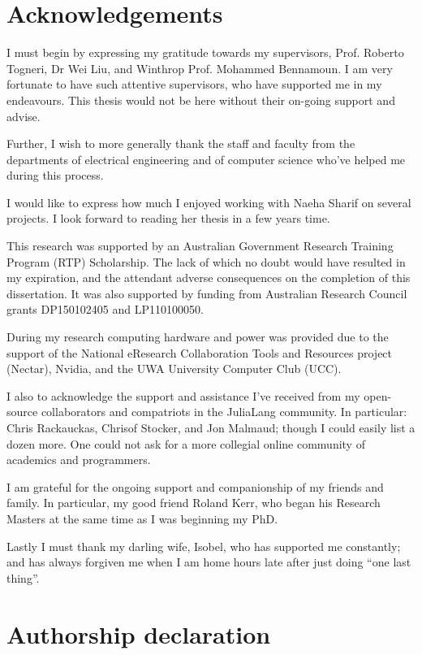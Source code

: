 \documentclass{book}
\begin{document}
\chapter*{Acknowledgements}
I must begin by expressing my gratitude towards my supervisors,
Prof. Roberto Togneri, Dr Wei Liu, and Winthrop Prof. Mohammed Bennamoun.
I am very fortunate to have such attentive supervisors,
who have supported me in my endeavours.
This thesis would not be here without their on-going support and advise.

Further, I wish to more generally thank the staff and faculty from the departments of electrical engineering and of computer science who've helped me during this process.

I would like to express how much I enjoyed working with Naeha Sharif on several projects.
I look forward to reading her thesis in a few years time.



This research was supported by an Australian Government Research Training Program (RTP) Scholarship.
The lack of which no doubt would have resulted in my expiration,
and the attendant adverse consequences on the completion of this dissertation.
It was also supported by funding from Australian Research Council grants DP150102405 and LP110100050.

During my research computing hardware and  power was provided due to the support of 
the National eResearch Collaboration Tools and Resources project (Nectar),
Nvidia, and the UWA University Computer Club (UCC).

I also to acknowledge the support and assistance I've received from my open-source collaborators and compatriots in the JuliaLang community.
In particular: Chris Rackauckas, Chrisof Stocker, and Jon Malmaud; though I could easily list a dozen more.
One could not ask for a more collegial online community of academics and programmers.

I am grateful for the ongoing support and companionship of my friends and family.
In particular, my good friend Roland Kerr, who began his Research Masters at the same time as I was beginning my PhD.

Lastly I must thank my darling wife, Isobel, who has supported me constantly;
and has always forgiven me when I am home hours late after just doing ``one last thing''.


\chapter*{Authorship declaration}
\end{document}
